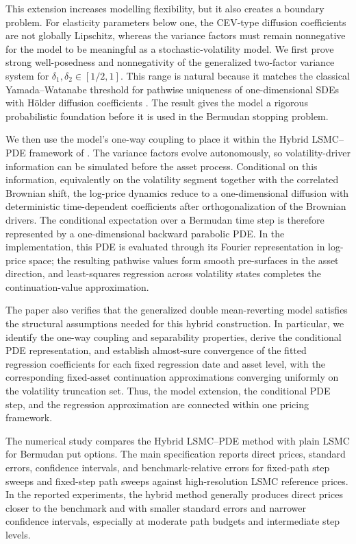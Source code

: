 \documentclass[pdflatex,sn-mathphys-num]{sn-jnl}
\theoremstyle{thmstyleone}%
\theoremstyle{thmstylethree}%
\theoremstyle{thmstyletwo}%
\begin{document}
This extension increases modelling flexibility, but it also creates a boundary problem. For elasticity parameters below one, the CEV-type diffusion coefficients are not globally Lipschitz, whereas the variance factors must remain nonnegative for the model to be meaningful as a stochastic-volatility model. We first prove strong well-posedness and nonnegativity of the generalized two-factor variance system for $\delta_1,\delta_2\in[1/2,1]$. This range is natural because it matches the classical Yamada--Watanabe threshold for pathwise uniqueness of one-dimensional SDEs with H\"older diffusion coefficients \citep{yamada1971uniqueness}. The result gives the model a rigorous probabilistic foundation before it is used in the Bermudan stopping problem.

We then use the model's one-way coupling to place it within the Hybrid LSMC--PDE framework of \cite{farahany2020mixing}. The variance factors evolve autonomously, so volatility-driver information can be simulated before the asset process. Conditional on this information, equivalently on the volatility segment together with the correlated Brownian shift, the log-price dynamics reduce to a one-dimensional diffusion with deterministic time-dependent coefficients after orthogonalization of the Brownian drivers. The conditional expectation over a Bermudan time step is therefore represented by a one-dimensional backward parabolic PDE. In the implementation, this PDE is evaluated through its Fourier representation in log-price space; the resulting pathwise values form smooth pre-surfaces in the asset direction, and least-squares regression across volatility states completes the continuation-value approximation.

The paper also verifies that the generalized double mean-reverting model satisfies the structural assumptions needed for this hybrid construction. In particular, we identify the one-way coupling and separability properties, derive the conditional PDE representation, and establish almost-sure convergence of the fitted regression coefficients for each fixed regression date and asset level, with the corresponding fixed-asset continuation approximations converging uniformly on the volatility truncation set. Thus, the model extension, the conditional PDE step, and the regression approximation are connected within one pricing framework.

The numerical study compares the Hybrid LSMC--PDE method with plain LSMC for Bermudan put options. The main specification reports direct prices, standard errors, confidence intervals, and benchmark-relative errors for fixed-path step sweeps and fixed-step path sweeps against high-resolution LSMC reference prices. In the reported experiments, the hybrid method generally produces direct prices closer to the benchmark and with smaller standard errors and narrower confidence intervals, especially at moderate path budgets and intermediate step levels.
\end{document}

